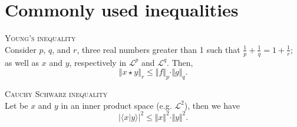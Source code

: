 %
%
%

\section{Commonly used inequalities}

\begin{lm}{\textsc{Young's inequality} \\}\label{A.3.1}
Consider $p$, $q$, and $r$, three real numbers greater than 1 such that $\frac{1}{p} + \frac{1}{q} = 1 + \frac{1}{r}$; as well as $x$ and $y$, respectively in $\mathcal{L}^{p}$ and $\mathcal{L}^{q}$.
Then,
\[\left\Vert x \star y\right\Vert_{r} \leq \Vert f \Vert_{p} \cdot \Vert g \Vert_{q}.\]
\end{lm}

\begin{lm}{\textsc{Cauchy Schwarz inequality} \\}\label{A.3.2}
Let be $x$ and $y$ in an inner product space (e.g. $\mathcal{L}^{2}$), then we have
\[\vert \langle x \vert y \rangle \vert^{2} \leq \Vert x \Vert^{2} \cdot \Vert y \Vert^{2}.\]
\end{lm}

